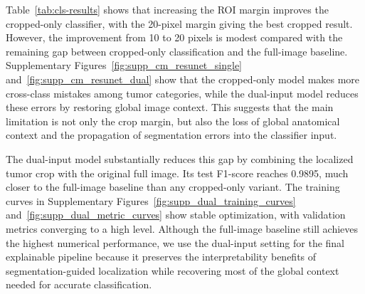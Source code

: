 \begin{table}[H]
    \centering
    \small
    \caption{Classification ablation results on the test set.}
    \label{tab:cls-results}
    \setlength{\tabcolsep}{1pt}
    \end{table}

Table~\ref{tab:cls-results} shows that increasing the ROI margin improves the cropped-only classifier, with the 20-pixel margin giving the best cropped result. However, the improvement from 10 to 20 pixels is modest compared with the remaining gap between cropped-only classification and the full-image baseline. Supplementary Figures~\ref{fig:supp_cm_resunet_single} and~\ref{fig:supp_cm_resunet_dual} show that the cropped-only model makes more cross-class mistakes among tumor categories, while the dual-input model reduces these errors by restoring global image context. This suggests that the main limitation is not only the crop margin, but also the loss of global anatomical context and the propagation of segmentation errors into the classifier input.

The dual-input model substantially reduces this gap by combining the localized tumor crop with the original full image. Its test F1-score reaches 0.9895, much closer to the full-image baseline than any cropped-only variant. The training curves in Supplementary Figures~\ref{fig:supp_dual_training_curves} and~\ref{fig:supp_dual_metric_curves} show stable optimization, with validation metrics converging to a high level. Although the full-image baseline still achieves the highest numerical performance, we use the dual-input setting for the final explainable pipeline because it preserves the interpretability benefits of segmentation-guided localization while recovering most of the global context needed for accurate classification.





